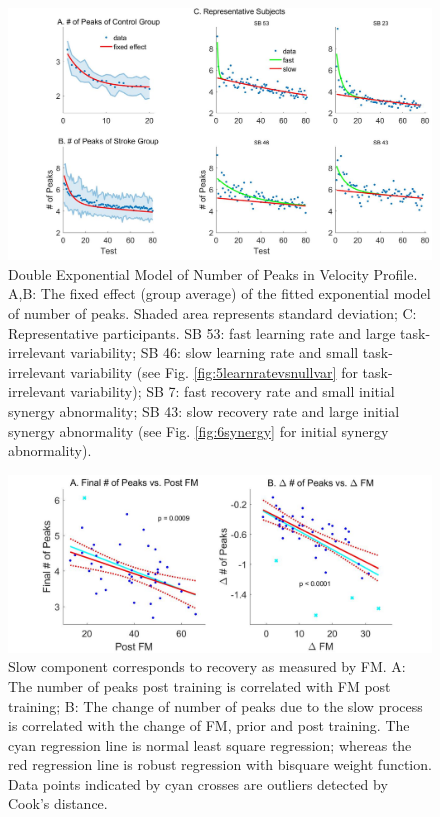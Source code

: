 \begin{figure}
	\centering
	\includegraphics[width=1\linewidth]{figures/3nopFixRan}
	\caption[Double Exponential Model]
	{Double Exponential Model of Number of Peaks in Velocity Profile. 
		A,B: The fixed effect (group average) of the fitted exponential model of number of peaks. 
			Shaded area represents standard deviation;
		C: Representative participants.
			SB 53: fast learning rate and large task-irrelevant variability; 
			SB 46: slow learning rate and small task-irrelevant variability (see Fig. \ref{fig:5learnratevsnullvar} for task-irrelevant variability);
			SB 7: fast recovery rate and small initial synergy abnormality;
			SB 43: slow recovery rate and large initial synergy abnormality (see Fig. \ref{fig:6synergy} for initial synergy abnormality).
	}
	\label{fig:3nopfixran}
\end{figure}

\begin{figure}
	\centering
	\includegraphics[width=1\linewidth]{figures/4slowComponentIsRecovery}
	\caption[Slow component corresponds to recovery as meaured by FM]
	{Slow component corresponds to recovery as measured by FM. 
		A: The number of peaks post training is correlated with FM post training;
		B: The change of number of peaks due to the slow process is correlated with the change of FM, prior and post training.
		The cyan regression line is normal least square regression; whereas the red regression line is robust regression with bisquare weight function. 
		Data points indicated by cyan crosses are outliers detected by Cook's distance.
	}
	\label{fig:4slowcomponentisrecovery}
\end{figure}


